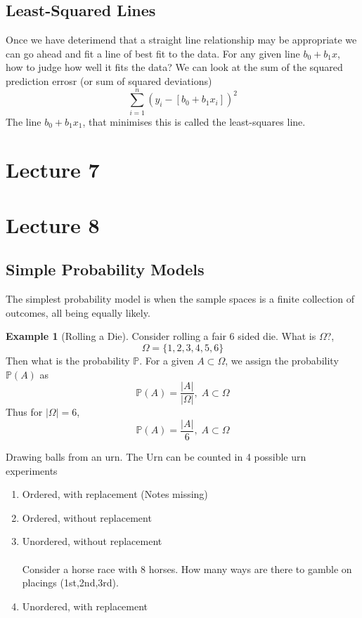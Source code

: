 \documentclass[a6paper]{article}
\theoremstyle{definition}
\newtheorem{example}{Example}
\theoremstyle{plain}
\newtheorem{theorem}{Theorem}
\theoremstyle{remark}
\begin{document}
\subsection{Least-Squared Lines}
Once we have deterimend that a straight line relationship may be appropriate we can go ahead and fit a line of best fit to the data. For any given line $ b_0 + b_1x $, how to judge how well it fits the data? We can look at the sum of the squared prediction errosr (or sum of squared deviations) 
$$ \sum_{i=1}^n (y_i - [b_0 + b_1x_i])^2 $$ 
The line $ b_0 + b_1 x_1 $, that minimises this is called the least-squares line.
\section{Lecture 7}
\section{Lecture 8}
\subsection{Simple Probability Models}
The simplest probability model is when the sample spaces is a finite collection
of outcomes, all being equally likely.
\begin{example}[Rolling a Die]
  Consider rolling a fair 6 sided die. What is $ \Omega $?,
  $$ \Omega = \{1,2,3,4,5,6\} $$
  Then what is the probability $ \mathbb{P} $. For a given $ A \subset \Omega
  $, we assign the probability $ \mathbb{P}(A) $ as 
  $$ \mathbb{P}(A) = \frac{|A|}{|\Omega|}, \; A \subset \Omega $$
  Thus for $ |\Omega| = 6 $,
  $$ \mathbb{P}(A) = \frac{|A|}{6}, \; A \subset \Omega $$
\end{example}
Drawing balls from an urn. The Urn can be counted in 4 possible urn experiments
\begin{enumerate}
  \item Ordered, with replacement
    (Notes missing)
  \item Ordered, without replacement  
  \item Unordered, without replacement \\\\
    Consider a horse race with 8 horses. How many ways are there to gamble on
    placings (1st,2nd,3rd).

  \item Unordered, with replacement
\end{enumerate}
\begin{center}
\end{center}
\end{document}

